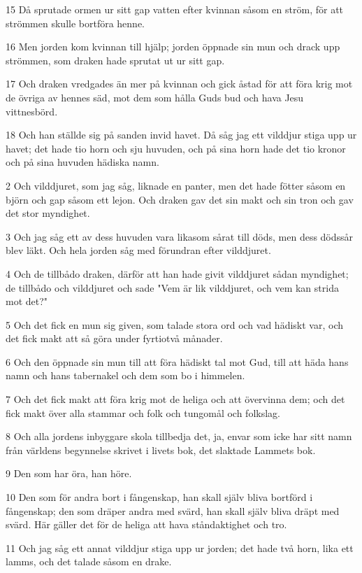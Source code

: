 \par 15 Då sprutade ormen ur sitt gap vatten efter kvinnan såsom en ström, för att strömmen skulle bortföra henne.
\par 16 Men jorden kom kvinnan till hjälp; jorden öppnade sin mun och drack upp strömmen, som draken hade sprutat ut ur sitt gap.
\par 17 Och draken vredgades än mer på kvinnan och gick åstad för att föra krig mot de övriga av hennes säd, mot dem som hålla Guds bud och hava Jesu vittnesbörd.
\par 18 Och han ställde sig på sanden invid havet. Då såg jag ett vilddjur stiga upp ur havet; det hade tio horn och sju huvuden, och på sina horn hade det tio kronor och på sina huvuden hädiska namn.
\par 2 Och vilddjuret, som jag såg, liknade en panter, men det hade fötter såsom en björn och gap såsom ett lejon. Och draken gav det sin makt och sin tron och gav det stor myndighet.
\par 3 Och jag såg ett av dess huvuden vara likasom sårat till döds, men dess dödssår blev läkt. Och hela jorden såg med förundran efter vilddjuret.
\par 4 Och de tillbådo draken, därför att han hade givit vilddjuret sådan myndighet; de tillbådo och vilddjuret och sade "Vem är lik vilddjuret, och vem kan strida mot det?"
\par 5 Och det fick en mun sig given, som talade stora ord och vad hädiskt var, och det fick makt att så göra under fyrtiotvå månader.
\par 6 Och den öppnade sin mun till att föra hädiskt tal mot Gud, till att häda hans namn och hans tabernakel och dem som bo i himmelen.
\par 7 Och det fick makt att föra krig mot de heliga och att övervinna dem; och det fick makt över alla stammar och folk och tungomål och folkslag.
\par 8 Och alla jordens inbyggare skola tillbedja det, ja, envar som icke har sitt namn från världens begynnelse skrivet i livets bok, det slaktade Lammets bok.
\par 9 Den som har öra, han höre.
\par 10 Den som för andra bort i fångenskap, han skall själv bliva bortförd i fångenskap; den som dräper andra med svärd, han skall själv bliva dräpt med svärd. Här gäller det för de heliga att hava ståndaktighet och tro.
\par 11 Och jag såg ett annat vilddjur stiga upp ur jorden; det hade två horn, lika ett lamms, och det talade såsom en drake.
